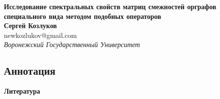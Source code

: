 \documentclass[12pt]{article}
\begin{document}
 

\begin{center}
    \textbf{Исследование спектральных свойств матриц
смежностей орграфов специального вида
методом подобных операторов}\\[3mm]
    \textbf{Сергей Козлуков}\\
    newkozlukov@gmail.com\\[2mm]
    \emph{Воронежский Государственный Университет}\\[2mm]
\end{center}

\subsection*{Аннотация}




\smallskip\centerline{\bf Литература} 
\begingroup
    \renewcommand{\section}[2]{}%
        
\endgroup
\end{document}
